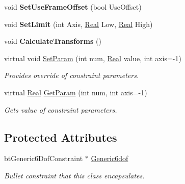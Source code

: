 \begin{DoxyCompactItemize}
\item 
\hypertarget{classphys_1_1Generic6DofConstraint_a579b6fab2dc4897cf984c7f1a0b67210}{
void {\bfseries SetUseFrameOffset} (bool UseOffset)}
\label{de/d2a/classphys_1_1Generic6DofConstraint_a579b6fab2dc4897cf984c7f1a0b67210}

\item 
\hypertarget{classphys_1_1Generic6DofConstraint_afbf5173d41f31dda693c3591b72adf1c}{
void {\bfseries SetLimit} (int Axis, \hyperlink{namespacephys_af7eb897198d265b8e868f45240230d5f}{Real} Low, \hyperlink{namespacephys_af7eb897198d265b8e868f45240230d5f}{Real} High)}
\label{de/d2a/classphys_1_1Generic6DofConstraint_afbf5173d41f31dda693c3591b72adf1c}

\item 
\hypertarget{classphys_1_1Generic6DofConstraint_ab954137222c74dbe2d4410738b3f6883}{
void {\bfseries CalculateTransforms} ()}
\label{de/d2a/classphys_1_1Generic6DofConstraint_ab954137222c74dbe2d4410738b3f6883}

\item 
virtual void \hyperlink{classphys_1_1Generic6DofConstraint_a644245f0533a2fe1586609fcf1f48171}{SetParam} (int num, \hyperlink{namespacephys_af7eb897198d265b8e868f45240230d5f}{Real} value, int axis=-\/1)
\begin{DoxyCompactList}\small\item\em Provides override of constraint parameters. \item\end{DoxyCompactList}\item 
virtual \hyperlink{namespacephys_af7eb897198d265b8e868f45240230d5f}{Real} \hyperlink{classphys_1_1Generic6DofConstraint_a822152201f9bd6d0a3e1512fa25b3f49}{GetParam} (int num, int axis=-\/1)
\begin{DoxyCompactList}\small\item\em Gets value of constraint parameters. \item\end{DoxyCompactList}\end{DoxyCompactItemize}
\subsection*{Protected Attributes}
\begin{DoxyCompactItemize}
\item 
\hypertarget{classphys_1_1Generic6DofConstraint_af323a51e2e4438fc86af1f10a84cc1ba}{
btGeneric6DofConstraint $\ast$ \hyperlink{classphys_1_1Generic6DofConstraint_af323a51e2e4438fc86af1f10a84cc1ba}{Generic6dof}}
\label{de/d2a/classphys_1_1Generic6DofConstraint_af323a51e2e4438fc86af1f10a84cc1ba}

\begin{DoxyCompactList}\small\item\em Bullet constraint that this class encapsulates. \item\end{DoxyCompactList}\end{DoxyCompactItemize}


